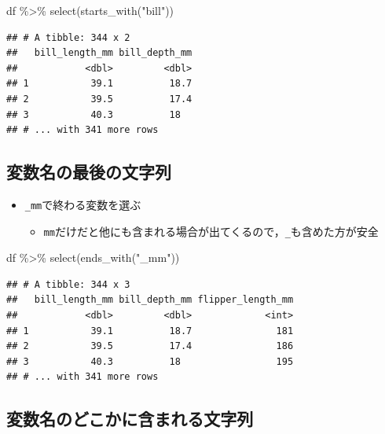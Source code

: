 \documentclass[
  xelatex,ja=standard, b5paper]{bxjsbook}
\newenvironment{Shaded}{\begin{snugshade}}{\end{snugshade}}
\newcommand{\FunctionTok}[1]{\textcolor[rgb]{0.00,0.00,0.00}{#1}}
\newcommand{\NormalTok}[1]{#1}
\newcommand{\SpecialCharTok}[1]{\textcolor[rgb]{0.00,0.00,0.00}{#1}}
\newcommand{\StringTok}[1]{\textcolor[rgb]{0.31,0.60,0.02}{#1}}
\providecommand{\tightlist}{%
  \setlength{\itemsep}{0pt}\setlength{\parskip}{0pt}}
\begin{document}
\begin{Shaded}
\begin{Highlighting}[]
\NormalTok{df }\SpecialCharTok{\%\textgreater{}\%}
  \FunctionTok{select}\NormalTok{(}\FunctionTok{starts\_with}\NormalTok{(}\StringTok{"bill"}\NormalTok{))}
\end{Highlighting}
\end{Shaded}

\begin{verbatim}
## # A tibble: 344 x 2
##   bill_length_mm bill_depth_mm
##            <dbl>         <dbl>
## 1           39.1          18.7
## 2           39.5          17.4
## 3           40.3          18  
## # ... with 341 more rows
\end{verbatim}

\hypertarget{select-helper2}{%
\subsection{変数名の最後の文字列}\label{select-helper2}}

\begin{itemize}
\tightlist
\item
  \texttt{\_mm}で終わる変数を選ぶ

  \begin{itemize}
  \tightlist
  \item
    \texttt{mm}だけだと他にも含まれる場合が出てくるので，\texttt{\_}も含めた方が安全
  \end{itemize}
\end{itemize}

\begin{Shaded}
\begin{Highlighting}[]
\NormalTok{df }\SpecialCharTok{\%\textgreater{}\%}
  \FunctionTok{select}\NormalTok{(}\FunctionTok{ends\_with}\NormalTok{(}\StringTok{"\_mm"}\NormalTok{))}
\end{Highlighting}
\end{Shaded}

\begin{verbatim}
## # A tibble: 344 x 3
##   bill_length_mm bill_depth_mm flipper_length_mm
##            <dbl>         <dbl>             <int>
## 1           39.1          18.7               181
## 2           39.5          17.4               186
## 3           40.3          18                 195
## # ... with 341 more rows
\end{verbatim}

\hypertarget{select-helper3}{%
\subsection{変数名のどこかに含まれる文字列}\label{select-helper3}}
\end{document}
